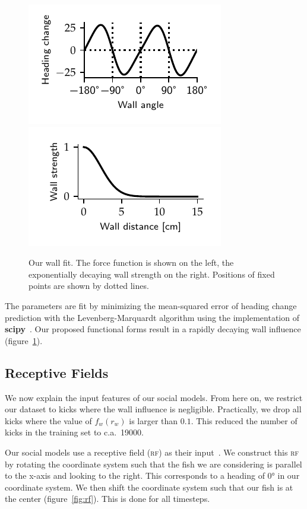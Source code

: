 \documentclass[nobib, a4paper]{tufte-handout}
\begin{document}
\begin{figure}[htb]
 \centering
 \includegraphics{wall_odd}~%
 \includegraphics{wall_force} 
 \caption{Our wall fit.
   The force function is shown on the left, the exponentially decaying wall strength on the right.
 Positions of fixed points are shown by dotted lines.}
\label{fig:wall-fit}
\end{figure}

The parameters are fit by minimizing the mean-squared error of heading change prediction with the Levenberg-Marquardt algorithm using the implementation of \textbf{scipy}~\autocite{scipy}.
Our proposed functional forms result in a rapidly decaying wall influence (figure~\ref{fig:wall-fit}).

\subsection{Receptive Fields}
We now explain the input features of our social models.
From here on, we restrict our dataset to kicks where the wall influence is negligible.
Practically, we drop all kicks where the value of \(f_w(r_w)\) is larger than $0.1$.
This reduced the number of kicks in the training set to c.a.\ 19000.

Our social models use a receptive field (\textsc{rf}) as their input~\autocite{discreteModes}.
We construct this \textsc{rf} by rotating the coordinate system such that the fish we are considering is parallel to the x-axis and looking to the right.
This corresponds to a heading of \ang{0} in our coordinate system.
We then shift the coordinate system such that our fish is at the center (figure~\ref{fig:rf}).
This is done for all timesteps.
\end{document}
